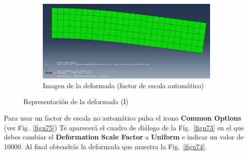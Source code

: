 \begin{enumerate}
\begin{figure}[H]
\begin{subfigure}{0.59\textwidth}
      \includegraphics[width=\textwidth]{./body/images/imagen72}
      \caption{Imagen de la deformada (factor de escala automático)}
      \label{figu72}
    \end{subfigure}%
    \caption{Representación de la deformada (I)}
  \end{figure}

  Para usar un factor de escala no automático pulsa el icono
  \textbf{Common Options} (ver Fig.~\ref{figu75}) Te aparecerá el
  cuadro de diálogo de la Fig.~\ref{figu73} en el que debes cambiar el
  \textbf{Deformation Scale Factor} a \textbf{Uniform} e indicar un
  valor de 10000. Al final obtendrás la deformada que muestra la
  Fig.~\ref{figu74}.


\end{enumerate}
